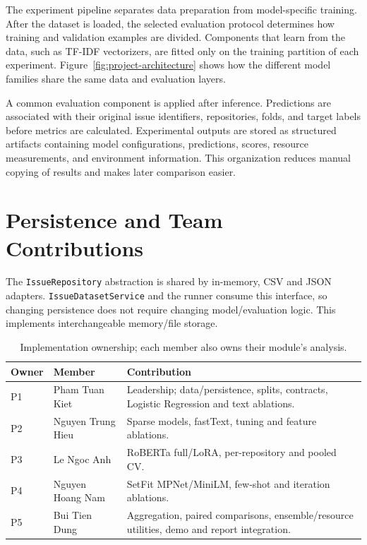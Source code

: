 The experiment pipeline separates data preparation from model-specific training. After the dataset is loaded, the selected evaluation protocol determines how training and validation examples are divided. Components that learn from the data, such as TF-IDF vectorizers, are fitted only on the training partition of each experiment. Figure~\ref{fig:project-architecture} shows how the different model families share the same data and evaluation layers.

A common evaluation component is applied after inference. Predictions are associated with their original issue identifiers, repositories, folds, and target labels before metrics are calculated. Experimental outputs are stored as structured artifacts containing model configurations, predictions, scores, resource measurements, and environment information. This organization reduces manual copying of results and makes later comparison easier.

\section{Persistence and Team Contributions}
The \texttt{IssueRepository} abstraction is shared by in-memory, CSV and JSON adapters. \texttt{IssueDatasetService} and the runner consume this interface, so changing persistence does not require changing model/evaluation logic. This implements interchangeable memory/file storage.

\begin{table}[H]
\centering\small
\caption{Implementation ownership; each member also owns their module's analysis.}
\begin{tabularx}{\textwidth}{l l X}
\toprule
Owner & Member & Contribution \\
\midrule
P1 & Pham Tuan Kiet & Leadership; data/persistence, splits, contracts, Logistic Regression and text ablations. \\
P2 & Nguyen Trung Hieu & Sparse models, fastText, tuning and feature ablations. \\
P3 & Le Ngoc Anh & RoBERTa full/LoRA, per-repository and pooled CV. \\
P4 & Nguyen Hoang Nam & SetFit MPNet/MiniLM, few-shot and iteration ablations. \\
P5 & Bui Tien Dung & Aggregation, paired comparisons, ensemble/resource utilities, demo and report integration. \\
\bottomrule
\end{tabularx}
\end{table}

